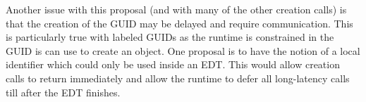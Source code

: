 Another issue with this proposal (and with many of the other creation
calls) is that the creation of the GUID may be delayed and require
communication. This is particularly true with labeled GUIDs as the
runtime is constrained in the GUID is can use to create an object. One
proposal is to have the notion of a local identifier which could only
be used inside an EDT. This would allow creation calls to return
immediately and allow the runtime to defer all long-latency calls till
after the EDT finishes.
